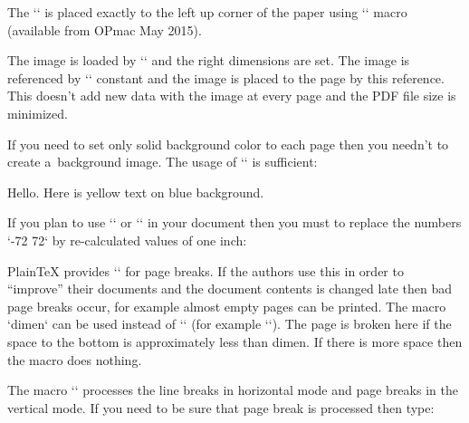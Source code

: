 The `\background` is placed exactly to the left up corner of the paper using `\prepghook` macro (available from OPmac May 2015). 



The image is loaded by `\pdfximage` and the right dimensions are set. The image is referenced by `\picbackground` constant and the image is placed to the page by this reference. This doesn't add new data with the image at every page and the PDF file size is minimized. 



If you need to set only solid background color to each page then you needn't to create a~background image. The usage of `\pdfliteral` is sufficient: 

\begtt
\def\prepghook{\pdfliteral{q \bgcolor\space k -0.996264 0 0 0.996264 -72 72 cm 
  \nopt{\hoffset} \nopt{\voffset} -\nopt{\pdfpagewidth} -\nopt{\pdfpageheight} re f Q}} 
\def\nopt#1{\expandafter\ignorept\the#1} 
 
\def\setbasecolor#1{#1\expandafter\setbasecolorA#1\pdfblackcolor} 
\def\setbgcolor#1{\expandafter\setbasecolorA#1\bgcolor} 
\def\setbasecolorA#1#2#3{\def#3{#2}} 
 
\setbasecolor\Yellow 
\setbgcolor\Blue 
 
Hello. Here is yellow text on blue background. 
\endtt


If you plan to use `\magnification` or `\magscale` in your document then you must to replace the numbers `-72 72` by re-calculated values of one inch: 

\begtt
\def\prepghook{\dimen0=.996264truein 
  \pdfliteral{q \bgcolor\space k -0.996264 0 0 0.996264 -\nopt{\dimen0 } \nopt{\dimen0 } cm 
  \nopt{\hoffset} \nopt{\voffset} -\nopt{\pdfpagewidth} -\nopt{\pdfpageheight} re f Q}} 
\endtt

 


PlainTeX provides `\vfil\break` for page breaks. If the authors use this in order to “improve” their documents and the document contents is changed late then bad page breaks occur, for example almost empty pages can be printed. The macro `\maybebreak dimen` can be used instead of `\vfil\break` (for example ``). The page is broken here if the space to the bottom is approximately less than dimen. If there is more space then the macro does nothing. 



The macro `\maybebreak` processes the line breaks in horizontal mode and page breaks in the vertical mode. If you need to be sure that page break is processed then type: 

